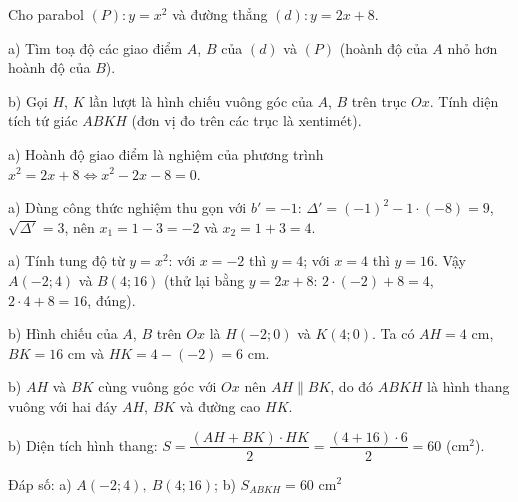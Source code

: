 \begin{problem}[9DS-HSB2-043]
Cho parabol $(P)\colon y = x^2$ và đường thẳng $(d)\colon y = 2x + 8$.

a) Tìm toạ độ các giao điểm $A$, $B$ của $(d)$ và $(P)$ (hoành độ của $A$ nhỏ hơn hoành độ của $B$).

b) Gọi $H$, $K$ lần lượt là hình chiếu vuông góc của $A$, $B$ trên trục $Ox$. Tính diện tích tứ giác $ABKH$ (đơn vị đo trên các trục là xentimét).

\begin{solution}
a) Hoành độ giao điểm là nghiệm của phương trình $x^2 = 2x + 8 \Leftrightarrow x^2 - 2x - 8 = 0$.

a) Dùng công thức nghiệm thu gọn với $b' = -1$: $\Delta' = (-1)^2 - 1 \cdot (-8) = 9$, $\sqrt{\Delta'} = 3$, nên $x_1 = 1 - 3 = -2$ và $x_2 = 1 + 3 = 4$.

a) Tính tung độ từ $y = x^2$: với $x = -2$ thì $y = 4$; với $x = 4$ thì $y = 16$. Vậy $A(-2; 4)$ và $B(4; 16)$ (thử lại bằng $y = 2x + 8$: $2 \cdot (-2) + 8 = 4$, $2 \cdot 4 + 8 = 16$, đúng).

b) Hình chiếu của $A$, $B$ trên $Ox$ là $H(-2; 0)$ và $K(4; 0)$. Ta có $AH = 4$ cm, $BK = 16$ cm và $HK = 4 - (-2) = 6$ cm.

b) $AH$ và $BK$ cùng vuông góc với $Ox$ nên $AH \parallel BK$, do đó $ABKH$ là hình thang vuông với hai đáy $AH$, $BK$ và đường cao $HK$.

b) Diện tích hình thang: $S = \dfrac{(AH + BK) \cdot HK}{2} = \dfrac{(4 + 16) \cdot 6}{2} = 60$ (cm$^2$).

Đáp số: a) $\boxed{A(-2; 4),\ B(4; 16)}$; b) $\boxed{S_{ABKH} = 60 \text{ cm}^2}$
\end{solution}
\end{problem}

